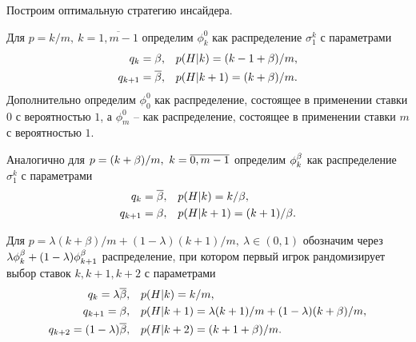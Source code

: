 Построим оптимальную стратегию инсайдера.

Для $p = k/m,\ k = \overline{1, m-1}$ определим $\phi^0_k$ как распределение $\sigma^k_1$ с параметрами
\begin{align*}
  q_k = \beta,& \quad p(H|k) = (k-1+\beta)/m,\\
  q_{k+1} = {\overline{\beta}},& \quad p(H|k + 1) = (k+\beta)/m.
\end{align*}
Дополнительно определим $\phi^0_0$ как распределение, состоящее в применении ставки $0$ с вероятностью $1$, а $\phi^0_m$ -- как распределение, состоящее в применении ставки $m$ с вероятностью $1$.

Аналогично для $p = (k+\beta)/m,\ k = \overline{0, m-1}$ определим $\phi^{\beta}_k$ как распределение $\sigma^k_1$ с параметрами
\begin{align*}
  q_k = {\overline{\beta}},& \quad p(H|k) = k/\beta,\\
  q_{k+1} = \beta,& \quad p(H|k + 1) = (k+1)/\beta.
\end{align*}

Для $p = \lambda (k+\beta)/m + (1-\lambda) (k+1)/m,\ \lambda \in (0, 1)$ обозначим через $\lambda \phi^{\beta}_k + (1-\lambda)\phi^{\beta}_{k+1}$ распределение, при котором первый игрок рандомизирует выбор ставок $k, k+1, k+2$ с параметрами
\begin{align*}
  q_k = \lambda{\overline{\beta}}, &\quad p(H|k) = k/m,\\
  q_{k+1} = \beta, &\quad p(H|k+1) = \lambda (k+1)/m + (1-\lambda) (k+\beta)/m,\\
  q_{k+2} = (1-\lambda){\overline{\beta}}, &\quad p(H|k+2) = (k+1+\beta)/m.
\end{align*}

